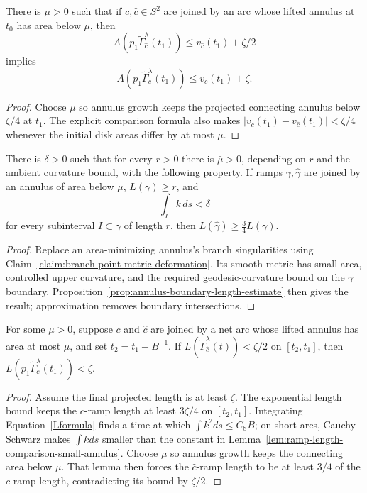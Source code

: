 \begin{lemma}
\label{lem:mu-net-area-comparison}
\label{muarea}
There is $\mu>0$ such that if $c,\hat c\in S^2$ are joined by an arc whose
lifted annulus at $t_0$ has area below $\mu$, then
\[
A(p_1\widetilde\Gamma_{\hat c}^\lambda(t_1))
\le v_{\hat c}(t_1)+\zeta/2
\]
implies
\[
A(p_1\widetilde\Gamma_c^\lambda(t_1))\le v_c(t_1)+\zeta.
\]
\end{lemma}
\begin{proof}
\sketch Choose $\mu$ so annulus growth keeps the projected connecting annulus below
$\zeta/4$ at $t_1$. The explicit comparison formula also makes
$|v_c(t_1)-v_{\hat c}(t_1)|<\zeta/4$ whenever the initial disk areas differ by
at most $\mu$.
\end{proof}

\begin{lemma}
\label{lem:ramp-length-comparison-small-annulus}
\label{BARMU}
There is $\delta>0$ such that for every $r>0$ there is $\bar\mu>0$, depending
on $r$ and the ambient curvature bound, with the following property. If ramps
$\gamma,\hat\gamma$ are joined by an annulus of area below $\bar\mu$,
$L(\gamma)\ge r$, and
\[
\int_I k\,ds<\delta
\]
for every subinterval $I\subset\gamma$ of length $r$, then
$L(\hat\gamma)\ge\frac34L(\gamma)$.
\end{lemma}
\begin{proof}
\sketch Replace an area-minimizing annulus's branch singularities using
Claim~\ref{claim:branch-point-metric-deformation}. Its smooth metric has small
area, controlled upper curvature, and the required geodesic-curvature bound on
the $\gamma$ boundary. Proposition~\ref{prop:annulus-boundary-length-estimate}
then gives the result; approximation removes boundary intersections.
\end{proof}

\begin{claim}
\label{claim:mu-net-length-comparison}
\label{mulength}
For some $\mu>0$, suppose $c$ and $\hat c$ are joined by a net arc whose
lifted annulus has area at most $\mu$, and set $t_2=t_1-B^{-1}$. If
$L(\widetilde\Gamma_{\hat c}^\lambda(t))<\zeta/2$ on $[t_2,t_1]$, then
$L(p_1\widetilde\Gamma_c^\lambda(t_1))<\zeta$.
\end{claim}
\begin{proof}
\sketch Assume the final projected length is at least $\zeta$. The exponential length
bound keeps the $c$-ramp length at least $3\zeta/4$ on $[t_2,t_1]$. Integrating
Equation~\eqref{Lformula} finds a time at which $\int k^2ds\le C_8B$; on short
arcs, Cauchy--Schwarz makes $\int kds$ smaller than the constant in
Lemma~\ref{lem:ramp-length-comparison-small-annulus}. Choose $\mu$ so annulus
growth keeps the connecting area below $\bar\mu$. That lemma then forces the
$\hat c$-ramp length to be at least $3/4$ of the $c$-ramp length, contradicting
its bound by $\zeta/2$.
\end{proof}

